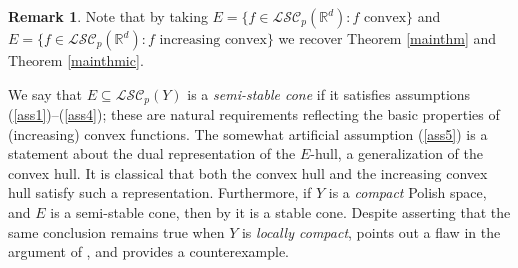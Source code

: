 \documentclass[reqno, a4paper]{amsart}
\newtheorem{theorem}{Theorem}[section]
\newcommand{\PP}{\mathcal{P}}
\newcommand{\R}{\mathbb R}
\theoremstyle{definition}
\theoremstyle{definition}
\newtheorem{example}[theorem]{Example}
\theoremstyle{definition}
\newtheorem{remark}[theorem]{Remark}
\newcommand{\LSC}{\mathcal{LSC}}
\begin{document}
\begin{remark}
    Note that by taking $E=\{f\in\LSC_p(\R^d): f\text{ convex}\}$ and $E=\{f\in\LSC_p(\R^d): f\text{ increasing convex}\}$ we recover Theorem \ref{mainthm} and Theorem \ref{mainthmic}.
\end{remark} 

We say that $E\subseteq \LSC_p(Y)$ is a \textit{semi-stable cone} if it satisfies assumptions (\ref{ass1})--(\ref{ass4}); these are natural requirements reflecting the basic properties of (increasing) convex functions. The somewhat artificial assumption (\ref{ass5}) is a statement about the dual representation of the $E$-hull, a generalization of the convex hull. It is classical that both the convex hull and the increasing convex hull satisfy such a representation.  Furthermore, if $Y$ is a \textit{compact} Polish space, and $E$ is a semi-stable cone, then by \cite[Corollary XI, T46] {meyer1966probability} it is a stable cone. Despite \cite{Gogus2013} asserting that the same conclusion remains true when  $Y$ is \textit{locally compact}, \cite{Khabibullin2021} points out a flaw in the argument of \cite{Gogus2013}, and \cite{Djire_Wiegerinck_2019} provides a counterexample. 









\end{document}
